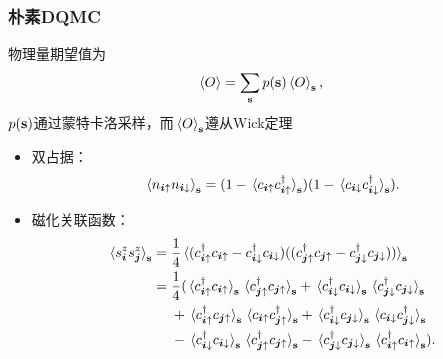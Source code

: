 \documentclass[UTF8]{ctexbeamer}
\begin{document}
\begin{frame}
\frametitle{朴素DQMC}

物理量期望值为
\begin{equation}
    \expval*{O} = \sum_{\vb{s}} p(\vb{s}) \expval*{O}_{\vb{s}},
\end{equation}    
$p(\vb{s})$通过蒙特卡洛采样，而$\expval*{O}_{\vb{s}}$遵从Wick定理

\begin{itemize}
    \item 双占据：
    \begin{equation}
        \expval*{n_{\vb*{i} \uparrow} n_{\vb*{i} \downarrow}}_{\vb{s}} = (1 - \expval*{c_{\vb*{i} \uparrow} c^\dagger_{\vb*{i} \uparrow}}_{\vb{s}})  (1 - \expval*{c_{\vb*{i} \downarrow} c^\dagger_{\vb*{i} \downarrow}}_{\vb{s}}).
    \end{equation}
    \item 磁化关联函数：
    \begin{equation}
        \begin{aligned}
            \expval*{s^z_{\vb*{i}} s^z_{\vb*{j}}}_{\vb{s}} &= \frac{1}{4} \expval*{(c^\dagger_{\vb*{i} \uparrow} c_{\vb*{i} \uparrow} - c^\dagger_{\vb*{i} \downarrow} c_{\vb*{i} \downarrow}) ((c^\dagger_{\vb*{j} \uparrow} c_{\vb*{j} \uparrow} - c^\dagger_{\vb*{j} \downarrow} c_{\vb*{j} \downarrow}))}_{\vb{s}} \\
            &= \frac{1}{4} (\expval*{c^\dagger_{\vb*{i} \uparrow} c_{\vb*{i} \uparrow}}_{\vb{s}} \expval*{c^\dagger_{\vb*{j} \uparrow} c_{\vb*{j} \uparrow}}_{\vb{s}}
            + \expval*{c^\dagger_{\vb*{i} \downarrow} c_{\vb*{i} \downarrow}}_{\vb{s}} \expval*{c^\dagger_{\vb*{j} \downarrow} c_{\vb*{j} \downarrow}}_{\vb{s}} \\
            &\quad \  + \expval*{c^\dagger_{\vb*{i} \uparrow} c_{\vb*{j} \uparrow}}_{\vb{s}} \expval*{c_{\vb*{i} \uparrow} c^\dagger_{\vb*{j} \uparrow}}_{\vb{s}} 
            + \expval*{c^\dagger_{\vb*{i} \downarrow} c_{\vb*{j} \downarrow}}_{\vb{s}} \expval*{c_{\vb*{i} \downarrow} c^\dagger_{\vb*{j} \downarrow}}_{\vb{s}} \\
            &\quad \  - \expval*{c^\dagger_{\vb*{i} \downarrow} c_{\vb*{i} \downarrow}}_{\vb{s}} \expval*{c^\dagger_{\vb*{j} \uparrow} c_{\vb*{j} \uparrow}}_{\vb{s}} - \expval*{c^\dagger_{\vb*{j} \downarrow} c_{\vb*{j} \downarrow}}_{\vb{s}} \expval*{c^\dagger_{\vb*{i} \uparrow} c_{\vb*{i} \uparrow}}_{\vb{s}} ).
        \end{aligned}
    \end{equation}
\end{itemize}

\end{frame}
\end{document}
